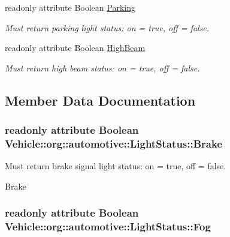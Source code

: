 \begin{DoxyCompactItemize}
readonly attribute Boolean \hyperlink{interfaceVehicle_1_1org_1_1automotive_1_1LightStatus_af841287af3e9d7f7437102e75e4922b2}{Parking}
\begin{DoxyCompactList}\small\item\em Must return parking light status\-: on = true, off = false. \end{DoxyCompactList}\item 
readonly attribute Boolean \hyperlink{interfaceVehicle_1_1org_1_1automotive_1_1LightStatus_a82173fb527011454e187e0aded475b20}{High\-Beam}
\begin{DoxyCompactList}\small\item\em Must return high beam status\-: on = true, off = false. \end{DoxyCompactList}\end{DoxyCompactItemize}


\subsection{Member Data Documentation}
\hypertarget{interfaceVehicle_1_1org_1_1automotive_1_1LightStatus_a60bfcf42172bd86ed2a95359e22d4293}{
\subsubsection[{Brake}]{\setlength{\rightskip}{0pt plus 5cm}readonly attribute Boolean Vehicle\-::org\-::automotive\-::\-Light\-Status\-::\-Brake}}\label{interfaceVehicle_1_1org_1_1automotive_1_1LightStatus_a60bfcf42172bd86ed2a95359e22d4293}


Must return brake signal light status\-: on = true, off = false. 

Brake \hypertarget{interfaceVehicle_1_1org_1_1automotive_1_1LightStatus_a94effa671c405740b86c461844c19bd6}{
\subsubsection[{Fog}]{\setlength{\rightskip}{0pt plus 5cm}readonly attribute Boolean Vehicle\-::org\-::automotive\-::\-Light\-Status\-::\-Fog}}\label{interfaceVehicle_1_1org_1_1automotive_1_1LightStatus_a94effa671c405740b86c461844c19bd6}


